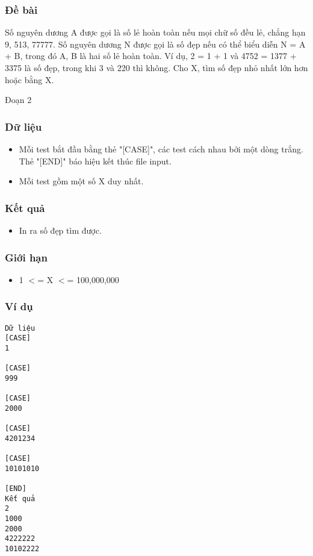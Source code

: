 



\subsubsection{   Đề bài  }

   Số nguyên dương A được gọi là số lẻ hoàn toàn nếu mọi chữ số đều lẻ, chẳng hạn 9, 513, 77777. Số nguyên dương N được gọi là số đẹp nếu có thể biểu diễn N = A + B, trong đó A, B là hai số lẻ hoàn toàn. Ví dụ, 2 = 1 + 1 và 4752 = 1377 + 3375 là số đẹp, trong khi 3 và 220 thì không. Cho X, tìm số đẹp nhỏ nhất lớn hơn hoặc bằng X.  

   Đoạn 2  

\subsubsection{   Dữ liệu  }
\begin{itemize}
	\item     Mỗi test bắt đầu bằng thẻ "[CASE]", các test cách nhau bởi một dòng trắng. Thẻ "[END]" báo hiệu kết thúc file input.   
	\item     Mỗi test gồm một số X duy nhất.   
\end{itemize}

\subsubsection{   Kết quả  }
\begin{itemize}
	\item     In ra số đẹp tìm được.   
\end{itemize}

\subsubsection{   Giới hạn  }
\begin{itemize}
	\item     1 $<$= X $<$= 100,000,000   
\end{itemize}

\subsubsection{   Ví dụ  }
\begin{verbatim}
Dữ liệu
[CASE]
1

[CASE]
999

[CASE]
2000

[CASE]
4201234

[CASE]
10101010

[END]
Kết quả
2
1000
2000
4222222
10102222
\end{verbatim}